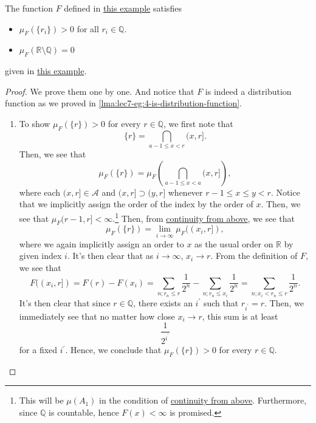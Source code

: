\begin{lemma}\label{lma:lec8-eg:3}
	The function \(F\) defined in \hyperref[eg:lec8-3]{this example} satisfies
	\begin{itemize}
		\item \(\mu _F(\{r_{i}\})>0\) for all \(r_{i}\in\mathbb{Q} \).
		\item \(\mu _F(\mathbb{R} \setminus \mathbb{Q} ) = 0\)
	\end{itemize}
	given in \hyperref[eg:lec8-3]{this example}.
\end{lemma}
\begin{proof}
	We prove them one by one. And notice that \(F\) is indeed a distribution function as we proved in \autoref{lma:lec7-eg:4-is-distribution-function}.
	\begin{enumerate}
		\item To show \(\mu _{F}(\{r\}) > 0\) for every \(r\in \mathbb{Q} \), we first note that
		      \[
			      \{r\} = \bigcap_{a-1\leq x< r}(x, r].
		      \]
		      Then, we see that
		      \[
			      \mu _{F}(\{r\}) = \mu _{F}\left(\bigcap_{a-1\leq x<a} (x, r]\right),
		      \]
		      where each \((x, r]\in\mathcal{A} \) and \((x, r]\supset (y, r]\) whenever \(r-1\leq x \leq y<r\). Notice that we implicitly
		      assign the order of the index by the order of \(x\). Then, we see that \(\mu _{F}(r-1, r]<\infty \).\footnote{This will be \(\mu (A_1)\) in the condition of \hyperref[thm:measure-space-continuity-from-above]{continuity from above}. Furthermore, since \(\mathbb{Q} \) is countable, hence \(F(x)<\infty \) is promised.}
		      Then, from \hyperref[thm:measure-space-continuity-from-above]{continuity from above}, we see that
		      \[
			      \mu _{F}(\{r\}) = \lim_{i \to \infty} \mu _{F}((x_{i}, r]),
		      \]
		      where we again implicitly assign an order to \(x\) as the usual order on \(\mathbb{R}\) by given index \(i\). It's then clear
		      that as \(i\to \infty \), \(x_{i}\to r\). From the definition of \(F\), we see that
		      \[
			      F((x_{i}, r]) = F(r) - F(x_{i}) = \sum_{n;r_{n}\leq r} \frac{1}{2^n} - \sum_{n;r_{n}\leq x_{i}} \frac{1}{2^n} = \sum_{n;x_{i}<r_{n}\leq r}\frac{1}{2^n}.
		      \]
		      It's then clear that since \(r\in \mathbb{Q} \), there exists an \(i ^\prime \) such that \(r_{i ^\prime } = r\). Then, we immediately see
		      that no matter how close \(x_{i}\to r\), this sum is at least
		      \[
			      \frac{1}{2^{i ^\prime }}
		      \]
		      for a fixed \(i ^\prime \). Hence, we conclude that \(\mu _{F}(\{r\}) > 0\) for every \(r\in\mathbb{Q} \).

\end{enumerate}
\end{proof}
